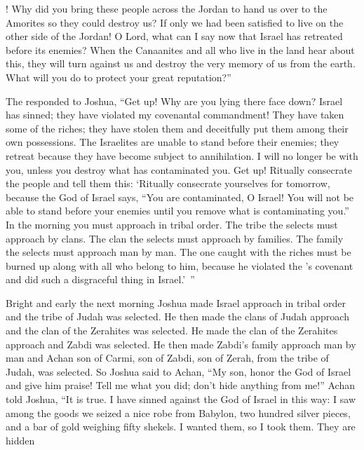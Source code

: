 {{}! Why
did you bring
these
people
across
the Jordan
to hand
us over
to the Amorites
so they could destroy us?
If only we had been satisfied to live on the other side of the Jordan! O
Lord,
what
can I say
now
that
Israel
has retreated
before
its enemies?
When
the Canaanites
and all
who live
in the land
hear about this, they will turn
against
us and destroy
the
very memory
of us from
the earth.
What
will you do
to protect your great
reputation?”
\par }{\PP {}The
{}
responded
to
Joshua,
“Get
up! Why
are you
lying
there face down?
Israel
has sinned;
they have
violated
my covenantal
commandment! They have
taken
some
of the riches;
they have
stolen
them and deceitfully
put
them among their own
possessions.
The Israelites
are unable
to stand
before
their enemies;
they retreat
because
they have become
subject to annihilation.
I will no
longer
be
with
you, unless
you destroy
what has contaminated you.
Get
up! Ritually consecrate
the
people
and tell
them this: ‘Ritually consecrate
yourselves for tomorrow,
because
the {}
God
of Israel
says, “You are contaminated,
O Israel! You will not
be able
to stand
before
your enemies
until
you remove
what is contaminating
you.”
In the morning
you must approach
in tribal
order.
The tribe
the {}
selects
must approach
by clans.
The clan
the {}
selects
must approach
by families.
The family
the {}
selects
must approach
man by man.
The one caught
with the riches
must be burned up
along
with all
who belong
to him, because
he violated
the
{}’s
covenant
and did
such a disgraceful thing
in Israel.’ ”
\par }{\PP {}Bright and early
the next morning
Joshua
made Israel
approach
in tribal
order
and the tribe
of Judah
was selected.
He then
made the clans
of Judah
approach
and the clan of the Zerahites was selected.
He made the clan
of the Zerahites
approach
and Zabdi
was selected.
He then
made Zabdi’s family
approach
man
by man and Achan
son
of Carmi,
son
of Zabdi,
son
of Zerah,
from the tribe
of Judah, was selected.
So Joshua
said
to
Achan,
“My son,
honor
the {}
God
of Israel
and give
him praise! Tell
me
what
you did;
don’t
hide
anything from me!”
Achan
told
Joshua,
“It is true.
I
have sinned
against the
{}
God
of Israel
in this
way:
I saw
among the goods
we seized
a
nice
robe
from Babylon,
two hundred
silver
pieces,
and a
bar
of gold
weighing
fifty
shekels.
I wanted
them, so
I took
them. They are hidden
}
